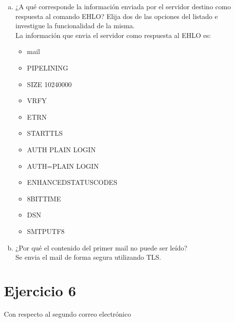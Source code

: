 \documentclass[osajnl,twocolumn,showpacs,superscriptaddress,10pt]{revtex4-1} %
\begin{document}
\begin{enumerate}[a)]
  \item ¿A qué corresponde la información enviada por el servidor destino como respuesta al comando EHLO? Elija dos de las opciones del listado e investigue la funcionalidad de la misma. \\

  La información que envia el servidor como respuesta al EHLO es:

  \begin{itemize}
    \item mail
    \item PIPELINING
    \item SIZE 10240000
    \item VRFY
    \item ETRN
    \item STARTTLS
    \item AUTH PLAIN LOGIN
    \item AUTH=PLAIN LOGIN
    \item ENHANCEDSTATUSCODES
    \item 8BITTIME
    \item DSN
    \item SMTPUTF8
  \end{itemize}

  \item ¿Por qué el contenido del primer mail no puede ser leído? \\

  Se envia el mail de forma segura utilizando TLS. \\
\end{enumerate}

\section{Ejercicio 6}

Con respecto al segundo correo electrónico \\
\end{document}

